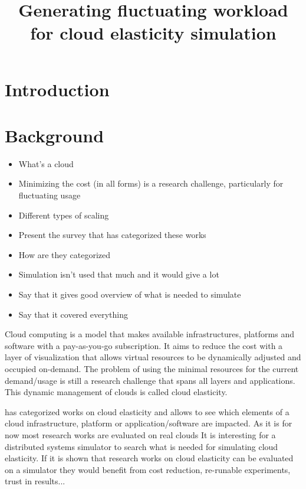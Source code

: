 \documentclass[a4paper]{IEEEtran}
\title{Generating fluctuating workload for cloud elasticity simulation}
\author{
	\IEEEauthorblockN{Simon Bihel}
	\IEEEauthorblockA{(Student) Computer Science Department, ENS Rennes\\
	\href{mailto:simon.bihel@ens-rennes.fr}{simon.bihel@ens-rennes.fr}}
}
\begin{document}
\maketitle

\begin{abstract}
\end{abstract}

\begin{IEEEkeywords}
\end{IEEEkeywords}

\section{Introduction} \label{intro}
\cite{casanova:hal-01017319} \cite{Naskos2016} \cite{tighe2013towards} 
\cite{calheiros2011cloudsim}

\section{Background} \label{background}
	\begin{itemize}
		\item What's a cloud
		\item Minimizing the cost (in all forms) is a research challenge,
		particularly for fluctuating usage
		\item Different types of scaling
		\item Present the survey that has categorized these works
    \item How are they categorized
		\item Simulation isn't used that much and it would give a lot
		\item Say that it gives good overview of what is needed to simulate
		\item Say that it covered everything
	\end{itemize}
  
  Cloud computing is a model that makes available infrastructures, platforms
  and software with a pay-as-you-go subscription. It aims to reduce the cost
  with a layer of visualization that allows virtual resources to be
  dynamically adjusted and occupied on-demand. The problem of using the
  minimal resources for the current demand/usage is still a research
  challenge that spans all layers and applications. This dynamic management
  of clouds is called cloud elasticity.
  
  \cite{Naskos2016} has categorized works on cloud elasticity and allows to see
  which elements of a cloud infrastructure, platform or application/software are
  impacted. As it is for now most research works are evaluated on real clouds It
  is interesting for a distributed systems simulator to search what is needed
  for simulating cloud elasticity. If it is shown that research works on cloud
  elasticity can be evaluated on a simulator they would benefit from cost
  reduction, re-runable experiments, trust in results...
  
\end{document}
